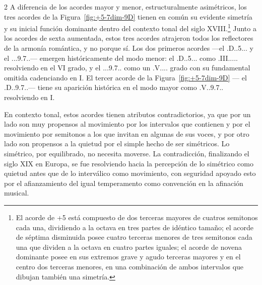 \documentclass[a4paper,11pt]{article}
\begin{document}
\begin{multicols}{2}
A diferencia de los acordes mayor y menor, estructuralmente asimétricos, los tres acordes de la Figura~\ref{fig:+5-7dim-9D} tienen en común su evidente simetría y su inicial función dominante dentro del contexto tonal del siglo XVIII.\footnote{El acorde de +5 está compuesto de dos terceras mayores de cuatros semitonos cada una, dividiendo a la octava en tres partes de idéntico tamaño; el acorde de séptima disminuida posee cuatro terceras menores de tres semitonos cada una que dividen a la octava en cuatro partes iguales; el acorde de novena dominante posee en sus extremos grave y agudo terceras mayores y en el centro dos terceras menores, en una combinación de ambos intervalos que dibujan también una simetría.} Junto a los acordes de sexta aumentada, estos tres acordes atrajeron todos los reflectores de la armonía romántica, y no porque sí. Los dos primeros acordes ---el \acorde.D..5\sostenidotxt... y el \acorde.\Dohne..9\bemoltxt.7..--- emergen históricamente del modo menor: el \acorde.D..5\sostenidotxt... como \acorde.III..... resolviendo en el VI grado, y el \acorde.\Dohne..9\bemoltxt.7.. como un \acorde.V.... grado con su fundamental omitida cadenciando en I. El tercer acorde de la Figura~\ref{fig:+5-7dim-9D} --- el \acorde.D..9.7..--- tiene su aparición histórica en el modo mayor como \acorde.V..9.7.. resolviendo en I.

En contexto tonal, estos acordes tienen atributos contradictorios, ya que por un lado son muy propensos al movimiento por los intervalos que contienen y por el movimiento por semitonos a los que invitan en algunas de sus voces, y por otro lado son propensos a la quietud por el simple hecho de ser simétricos. Lo simétrico, por equilibrado, no necesita moverse. La contradicción, finalizando el siglo XIX en Europa, se fue resolviendo hacia la percepción de lo simétrico como quietud antes que de lo interválico como movimiento, con seguridad apoyado esto por el afianzamiento del igual temperamento como convención en la afinación musical.


\end{multicols}
\end{document}
